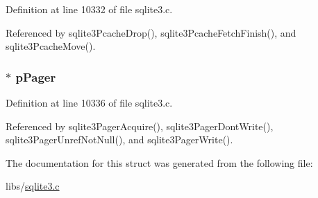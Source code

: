 Definition at line 10332 of file sqlite3.\+c.



Referenced by sqlite3\+Pcache\+Drop(), sqlite3\+Pcache\+Fetch\+Finish(), and sqlite3\+Pcache\+Move().

\hypertarget{struct_pg_hdr_a916447fa61ba4e11cc93d571a66d3aaf}{}
\subsubsection[{p\+Pager}]{$\ast$ p\+Pager}\label{struct_pg_hdr_a916447fa61ba4e11cc93d571a66d3aaf}


Definition at line 10336 of file sqlite3.\+c.



Referenced by sqlite3\+Pager\+Acquire(), sqlite3\+Pager\+Dont\+Write(), sqlite3\+Pager\+Unref\+Not\+Null(), and sqlite3\+Pager\+Write().



The documentation for this struct was generated from the following file\+:\begin{DoxyCompactItemize}
\item 
libs/\hyperlink{sqlite3_8c}{sqlite3.\+c}\end{DoxyCompactItemize}
